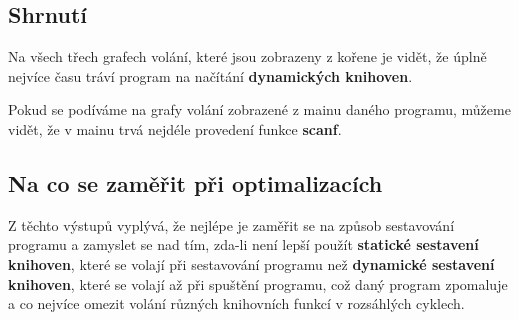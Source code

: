 \documentclass[12pt]{article}
\begin{document}
\begin{figure}[ht]
    \centering
\end{figure}
\begin{figure}[ht]
    \centering
\end{figure}
\newpage
\subsection{Shrnutí}
Na všech třech grafech volání, které jsou zobrazeny z kořene je vidět, že úplně nejvíce času tráví program na načítání \textbf {dynamických knihoven}.

\noindent Pokud se podíváme na grafy volání zobrazené z mainu daného programu, můžeme vidět, že v mainu trvá nejdéle provedení funkce \textbf{scanf}.
\subsection{Na co se zaměřit při optimalizacích}
Z těchto výstupů vyplývá, že nejlépe je zaměřit se na způsob sestavování programu a zamyslet se nad tím, zda-li není lepší použít \textbf{statické sestavení knihoven}, které se volají při sestavování programu než \textbf{dynamické sestavení knihoven}, které se volají až při spuštění programu, což daný program zpomaluje a co nejvíce omezit volání různých knihovních funkcí v rozsáhlých cyklech.
\end{document}
